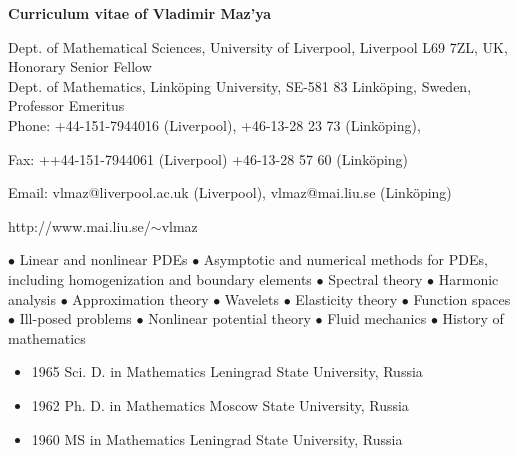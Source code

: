 \documentclass{article}
\begin{document}
\begin{center}

\textbf{\Large Curriculum vitae of
Vladimir Maz'ya}

\end{center}

\bigskip

\noindent
Dept. of Mathematical Sciences, University of Liverpool, Liverpool L69 7ZL, UK, Honorary Senior Fellow\\
Dept. of Mathematics, Link\"oping University,
SE-581 83 Link\"oping, Sweden, Professor Emeritus\\
  Phone: +44-151-7944016 (Liverpool),
  +46-13-28 23 73 (Link\"oping),

 Fax: ++44-151-7944061 (Liverpool)
 +46-13-28 57 60 (Link\"oping)
\noindent

 Email:
        {vlmaz@liverpool.ac.uk} (Liverpool),
        {vlmaz@mai.liu.se} (Link\"oping)

  {http://www.mai.liu.se/$\sim$vlmaz}


\medskip


\medskip
         $\bullet$ Linear and nonlinear PDEs
      $\bullet$  Asymptotic and numerical methods
for PDEs,  including homogenization and boundary elements
       $\bullet$  Spectral theory
     $\bullet$ Harmonic analysis
 $\bullet$  Approximation theory
      $\bullet$ Wavelets
      $\bullet$  Elasticity theory
     $\bullet$  Function spaces
    $\bullet$  Ill-posed problems
       $\bullet$  Nonlinear potential theory
    $\bullet$  Fluid mechanics
      $\bullet$  History of mathematics


\medskip

\begin{itemize}
       \item 1965 Sci. D. in Mathematics
Leningrad State University, Russia
       \item 1962 Ph. D. in Mathematics Moscow
State University, Russia
       \item 1960 MS in Mathematics Leningrad
State University, Russia
\end{itemize}

\medskip
\end{document}
